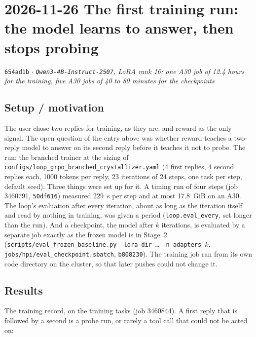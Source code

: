 \documentclass[11pt,a4paper]{article}
\newcommand{\commit}[1]{\texttt{\textcolor{commitgray}{#1}}}
\begin{document}
\section*{2026-11-26 \quad The first training run: the model learns to answer,
then stops probing}

\commit{654ad1b} $\cdot$ \textit{\texttt{Qwen3-4B-Instruct-2507}, LoRA rank 16;
one A30 job of 12.4 hours for the training, five A30 jobs of 40 to 80
minutes for the checkpoints}

\subsection*{Setup / motivation}

The user chose two replies for training, as they are, and reward as the only
signal. The open question of the entry above was whether reward teaches a
two-reply model to answer on its second reply before it teaches it not to
probe. The run: the branched trainer at the sizing of
\texttt{configs/loop\_grpo\_branched\_crystallizer.yaml} (4 first replies,
4 second replies each, 1000 tokens per reply, 23 iterations of 24 steps, one
task per step, default seed). Three things were set up for it. A timing run
of four steps (job 3460791, \commit{50df616}) measured 229~s per step and at
most 17.8~GiB on an A30. The loop's evaluation after every iteration, about
as long as the iteration itself and read by nothing in training, was given a
period (\texttt{loop.eval\_every}, set longer than the run). And a
checkpoint, the model after $k$ iterations, is evaluated by a separate job
exactly as the frozen model is in Stage~2
(\texttt{scripts/eval\_frozen\_baseline.py --lora-dir \ldots\ --n-adapters
$k$}, \texttt{jobs/hpi/eval\_checkpoint.sbatch}, \commit{b808230}). The
training job ran from its own code directory on the cluster, so that later
pushes could not change it.

\subsection*{Results}

The training record, on the training tasks (job 3460844). A first reply
that is followed by a second is a probe run, or rarely a tool call that
could not be acted on:

\begin{center}\small
\resizebox{\linewidth}{!}{}
\end{center}
\end{document}
